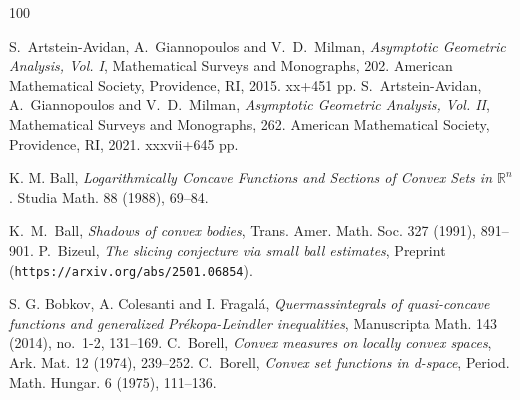 \documentclass[11pt,leqno]{article}
\theoremstyle{definition}
\theoremstyle{remark}
\numberwithin{equation}{section}
\newcommand{\1}{\textbf{1}}
\begin{document}
\bigskip


\footnotesize

\begin{thebibliography}{100}
\footnotesize





 {\rm S.\ Artstein-Avidan, A.\ Giannopoulos and V.\ D.\ Milman},
\textit{Asymptotic Geometric Analysis, Vol. I}, Mathematical Surveys and Monographs, 202.
American Mathematical Society, Providence, RI, 2015. xx+451 pp.
 {\rm S.\ Artstein-Avidan, A.\ Giannopoulos and V.\ D.\ Milman},
\textit{Asymptotic Geometric Analysis, Vol. II}, Mathematical Surveys and Monographs, 262.
American  Mathematical Society, Providence, RI, 2021. xxxvii+645 pp.

 {\rm K. M. Ball}, {\sl Logarithmically Concave Functions and Sections of Convex Sets in ${\mathbb R}^n$}.
Studia Math. 88 (1988), 69--84.

 {\rm K.\ M.\ Ball}, {\sl Shadows of convex bodies}, Trans. Amer. Math. Soc. {327} (1991), 891--901.
 \textrm{P.\ Bizeul}, \textit{The slicing conjecture via small ball estimates},
Preprint ({\tt https://arxiv.org/abs/2501.06854}).

 S. G. Bobkov, A. Colesanti and I. Fragal\'{a},
\textit{Quermassintegrals of quasi-concave functions and generalized Pr\'{e}kopa-Leindler inequalities},
 Manuscripta Math. 143 (2014), no.~1-2, 131--169. 
 {\rm C.\ Borell}, {\sl Convex measures on locally convex spaces},
Ark. Mat. {12} (1974), 239--252.
 {\rm C.\ Borell}, {\sl Convex set functions in d-space},
Period. Math. Hungar. {6} (1975), 111--136.


\end{thebibliography}
\end{document}

